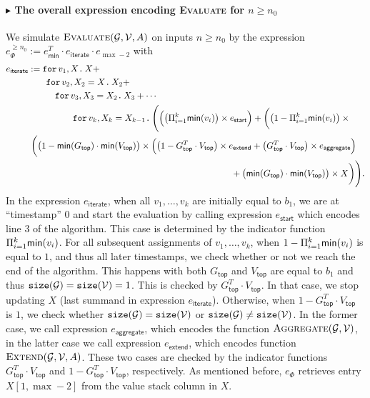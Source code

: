 \paragraph{$\blacktriangleright$ The overall expression encoding {\normalfont \textsc{Evaluate}} for $n\geq n_0$}
We simulate $\textsc{Evaluate}(\mathcal{G},\mathcal{V},A)$ on inputs $n\geq n_0$ by the expression
$e_{\Phi}^{\geq n_0}:= e_{\mathsf{min}}^T\cdot e_{\mathsf{iterate}}\cdot e_{\max -2}$ with
    \begin{align*}\allowdisplaybreaks
		e_{\mathsf{iterate}}&:= \ffor{v_1}{X} X+\\
		& \qquad\ffor{v_2}{X_2=X} X_2+ \\
		& \qquad \quad \ffor{v_3}{X_3=X_2} X_3+ \cdots\\
		& \qquad \qquad\quad \ffor{v_k}{X_{k}=X_{k-1}} \Biggl(\Bigl(\bigl( \sprod_{i=1}^k \mathsf{min}(v_i)\bigr) \times e_{\mathsf{start}}\Bigr) + 
        \biggl( \bigl(1- \sprod_{i=1}^k \mathsf{min}(v_i)\bigr)\times{}\\
        &\hspace{0.3em} \biggl( \bigl(1 -\mathsf{min}(G_{\mathsf{top}})\cdot \mathsf{min}(V_{\mathsf{top}})\bigr) \times \Bigl(\bigl( 1 - G_{\mathsf{top}}^T\cdot V_{\mathsf{top}}\bigr) \times e_{\mathsf{extend}} + 
        \bigl(G_{\mathsf{top}}^T\cdot V_{\mathsf{top}}\bigr) \times e_{\mathsf{aggregate}}\Bigl)  \\
        &\hspace{8cm}+\bigl(\mathsf{min}(G_{\mathsf{top}})\cdot \mathsf{min}(V_{\mathsf{top}})\bigr)\times X\biggr)\Biggr).
	   \end{align*}
In the expression $e_{\mathsf{iterate}}$, when all $v_1,\ldots,v_k$ are initially equal to $b_1$, we are at ``timestamp'' $0$ and start the evaluation by 
calling expression $e_{\mathsf{start}}$ which encodes line 3 of the algorithm. This case is determined by the indicator function
$ \Pi_{i=1}^k \mathsf{min}(v_i)$. For all subsequent assignments of $v_1,\ldots,v_k$, when $1- \Pi_{i=1}^k \mathsf{min}(v_i)$ is equal to $1$, and thus all
later timestamps, we check whether or not we reach the end of the algorithm. This happens with both $G_{\mathsf{top}}$ and $V_{\mathsf{top}}$ are equal to $b_1$
and thus $\texttt{size}(\mathcal{G})=\texttt{size}(\mathcal{V})=1$. This is checked by $G_{\mathsf{top}}^T\cdot V_{\mathsf{top}}$.
In that case, we stop updating $X$ (last summand in expression $e_{\mathsf{iterate}}$). Otherwise, when $1-G_{\mathsf{top}}^T\cdot V_{\mathsf{top}}$ is $1$, we check whether $\texttt{size}(\mathcal{G})=\texttt{size}(\mathcal{V})$ or $\texttt{size}(\mathcal{G})\neq \texttt{size}(\mathcal{V})$. In the former case, we call expression $e_{\mathsf{aggregate}}$, which encodes the function $\textsc{Aggregate}(\mathcal{G},\mathcal{V})$, in the latter case we call expression $e_{\mathsf{extend}}$, which encodes function $\textsc{Extend}(\mathcal{G},\mathcal{V},A)$. These two cases are checked by the indicator functions $G_{\mathsf{top}}^T\cdot V_{\mathsf{top}}$ and  $1 - G_{\mathsf{top}}^T\cdot V_{\mathsf{top}}$, respectively. As mentioned before, $e_\Phi$ retrieves entry $X[1,\max-2]$ from the value stack column in $X$. 
